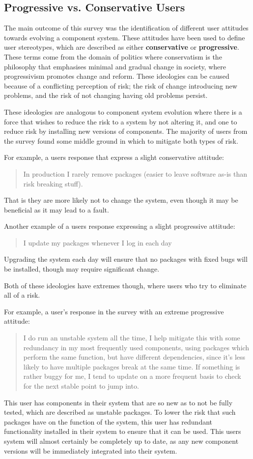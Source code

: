 \subsection{Progressive vs. Conservative Users}
The main outcome of this survey was the identification of different user attitudes towards evolving a component system.
These attitudes have been used to define user stereotypes, which are described as either \textbf{conservative} or \textbf{progressive}.
These terms come from the domain of politics where conservatism is the philosophy that emphasises minimal and gradual change in society,
where progressivism promotes change and reform.
These ideologies can be caused because of a conflicting perception of risk; the risk of change introducing new problems, and the risk of not changing having old problems persist.

These ideologies are analogous to component system evolution where there is a force that wishes to reduce the risk to a system by not altering it,
and one to reduce risk by installing new versions of components.
The majority of users from the survey found some middle ground in which to mitigate both types of risk.

For example, a users response that express a slight conservative attitude:
\begin{quotation}
In production I rarely remove packages (easier to leave software as-is than risk breaking stuff).
\end{quotation}
That is they are more likely not to change the system, even though it may be beneficial as it may lead to a fault. 

Another example of a users response expressing a slight progressive attitude:
\begin{quotation}
I update my packages whenever I log in each day
\end{quotation}
Upgrading the system each day will ensure that no packages with fixed bugs will be installed, though may require significant change.

Both of these ideologies have extremes though, where users who try to eliminate all of a risk.

For example, a user's response in the survey with an extreme progressive attitude:
\begin{quotation}
I do run an unstable system all the time, I help mitigate this with some redundancy in my most frequently used components, 
using packages which perform the same function, but have different dependencies, since it's less likely to have multiple packages break at the same time. 
If something is rather buggy for me, I tend to update on a more frequent basis to check for the next stable point to jump into.
\end{quotation}
This user has components in their system that are so new as to not be fully tested, which are described as unstable packages.
To lower the risk that such packages have on the function of the system, this user has redundant functionality installed in their system to ensure that it can be used.
This users system will almost certainly be completely up to date, as any new component versions will be immediately integrated into their system.

